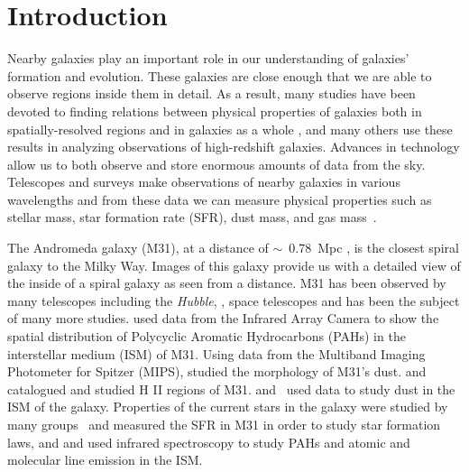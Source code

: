 \section{Introduction} 
Nearby galaxies play an important role in our understanding of galaxies' formation and evolution.
These galaxies are close enough that we are able to observe regions inside them in detail.
As a result, many studies have been devoted to finding relations between physical properties of galaxies both in spatially-resolved regions and in galaxies as a whole%
, and many others use these results in analyzing observations of high-redshift galaxies. %
Advances in technology allow us to both observe and store enormous amounts of data from the sky.
Telescopes and surveys make observations of nearby galaxies in various wavelengths and from these data we can measure physical properties such as stellar mass, star formation rate (SFR), dust mass, and gas mass~\citep[e.g.][]{Calzetti07,Dale09,Eskew12}.

The Andromeda galaxy (M31), at a distance of $\sim$~0.78~Mpc \citep{McConnachie05}, is the closest spiral galaxy to the Milky Way.
Images of this galaxy provide us with a detailed view of the inside of a spiral galaxy as seen from a distance.
M31 has been observed by many telescopes including the {\it Hubble}, \Spitzer, \Herschel space telescopes and has been the subject of many more studies.
\cite{Barmby06} used data from the \Spitzer Infrared Array Camera \citep[IRAC;][]{Fazio04} to show the spatial distribution of Polycyclic Aromatic Hydrocarbons (PAHs) in the interstellar medium (ISM) of M31.
Using data from the Multiband Imaging Photometer for Spitzer (MIPS), \cite{Gordon06} studied the morphology of M31's dust.
\cite{Azimlu11} and \cite{Sanders12} catalogued and studied H {\sc II} regions of M31.
\cite{Draine14, Mattsson14, Viaene14, Smith12} and~\cite{Fritz12} used \Herschel data to study dust in the ISM of the galaxy.
Properties of the current stars in the galaxy were studied by many groups~\citep[e.g.][and references therein]{Massey07,Tamm12,Dalcanton12}
\cite{Rahmani16, Ford13} and \cite{Tabatabaei10} measured the SFR in M31 in order to study star formation laws, and \cite{Dim15} and \cite{Kapala15} used infrared spectroscopy to study PAHs and atomic and molecular line emission in the ISM.

